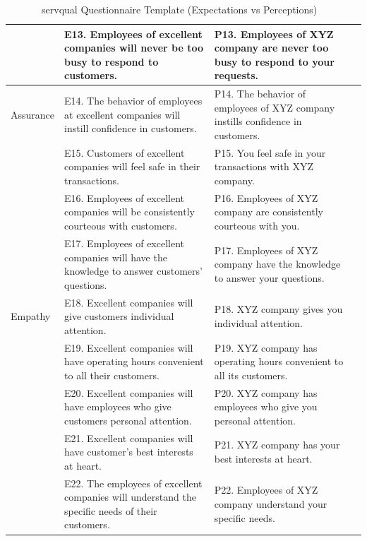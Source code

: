 \begin{table}[ht]
{\begin{tabular}{p{2.5cm} p{6cm} p{6cm} p{1.5cm}}
 & E13. Employees of excellent companies will never be too busy to respond to customers. & P13. Employees of XYZ company are never too busy to respond to your requests. & \\
\hline
Assurance & E14. The behavior of employees at excellent companies will instill confidence in customers. & P14. The behavior of employees of XYZ company instills confidence in customers. & \\
 & E15. Customers of excellent companies will feel safe in their transactions. & P15. You feel safe in your transactions with XYZ company. & \\
 & E16. Employees of excellent companies will be consistently courteous with customers. & P16. Employees of XYZ company are consistently courteous with you. & \\
 & E17. Employees of excellent companies will have the knowledge to answer customers’ questions. & P17. Employees of XYZ company have the knowledge to answer your questions. & \\
\hline
Empathy & E18. Excellent companies will give customers individual attention. & P18. XYZ company gives you individual attention. & \\
 & E19. Excellent companies will have operating hours convenient to all their customers. & P19. XYZ company has operating hours convenient to all its customers. & \\
 & E20. Excellent companies will have employees who give customers personal attention. & P20. XYZ company has employees who give you personal attention. & \\
 & E21. Excellent companies will have customer’s best interests at heart. & P21. XYZ company has your best interests at heart. & \\
 & E22. The employees of excellent companies will understand the specific needs of their customers. & P22. Employees of XYZ company understand your specific needs. & \\
\hline
\end{tabular}
}
\caption{\ac{servqual} Questionnaire Template (Expectations vs Perceptions) ~\cite{master_servqual_model}} 
\label{table:servqual_template}
\end{table}


